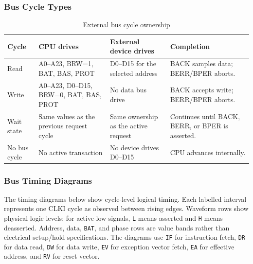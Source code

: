 \subsubsection{Bus Cycle Types}

\begin{table}[H]
	\centering
	\small
	\begin{tabularx}{\textwidth}{lXXX}
		\toprule
		\textbf{Cycle} & \textbf{CPU drives}                       & \textbf{External device drives}      & \textbf{Completion}                              \\
		\midrule
		Read           & A0--A23, BRW=1, BAT, BAS, PROT            & D0--D15 for the selected address     & BACK samples data; BERR/BPER aborts.             \\
		Write          & A0--A23, D0--D15, BRW=0, BAT, BAS, PROT   & No data bus drive                    & BACK accepts write; BERR/BPER aborts.            \\
		Wait state     & Same values as the previous request cycle & Same ownership as the active request & Continues until BACK, BERR, or BPER is asserted. \\
		No bus cycle   & No active transaction                     & No device drives D0--D15             & CPU advances internally.                         \\
		\bottomrule
	\end{tabularx}
	\caption{External bus cycle ownership}
	\label{tab:bus-cycle-ownership}
\end{table}

\subsubsection{Bus Timing Diagrams}

The timing diagrams below show cycle-level logical timing. Each labelled interval represents one CLKI cycle as observed
between rising edges. Waveform rows show physical logic levels; for active-low signals, \texttt{L} means asserted and
\texttt{H} means deasserted. Address, data, \texttt{BAT}, and phase rows are value bands rather than electrical
setup/hold specifications. The diagrams use \texttt{IF} for instruction fetch, \texttt{DR} for data read, \texttt{DW}
for data write, \texttt{EV} for exception vector fetch, \texttt{EA} for effective address, and \texttt{RV} for reset
vector.

